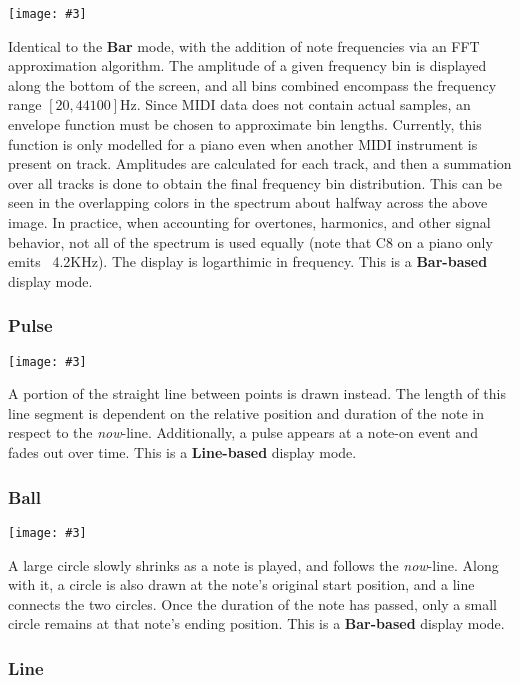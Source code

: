 \documentclass[english]{article}
\makeatletter
\newenvironment{restoretext}%
    {\@parboxrestore%
     \begin{adjustwidth}{}{\leftmargin}%
    }{\end{adjustwidth}
     }
\def\rcbegin{\begin{restoretext}\centering}
\def\rcend{\end{restoretext}}
\newcommand{\rcgnc}[3][]{
  \rcbegin
    \texttt{[image: \#3]}
  \rcend
  \vspace{1em}
}
\makeatother
\begin{document}
\rcgnc{0.86}{image/fft.png}

Identical to the \textbf{Bar} mode, with the addition of note frequencies via 
an FFT approximation algorithm. The amplitude of a given frequency bin is
displayed along the bottom of the screen, and all bins combined encompass the
frequency range $[20, 44100]$Hz.
Since MIDI data does not contain actual samples, an envelope function
must be chosen to approximate bin lengths. Currently, this function
is only modelled for a piano even when another MIDI instrument is present on track. Amplitudes are calculated
for each track, and then a summation over all tracks is done to obtain the final frequency bin distribution.
This can be seen in the overlapping colors in the spectrum about halfway across the above image. In practice, 
when accounting for overtones, harmonics, and other signal behavior, not all of the spectrum is used equally
(note that C8 on a piano only emits ~4.2KHz). The display is logarthimic in frequency. 
This is a \textbf{Bar-based} display mode.

\newpage
\subsubsection{Pulse}

\rcgnc{0.86}{image/pulse.png}

A portion of the straight line between points is drawn instead. The length of this
line segment is dependent on the relative position and duration of the note in respect to the \textit{now}-line.
Additionally, a pulse appears at a note-on event and fades out over time.
This is a \textbf{Line-based} display mode.


\subsubsection{Ball}

\rcgnc{0.86}{image/ball.png}

A large circle slowly shrinks as a note is played, and follows the \textit{now}-line. Along with it, a 
circle is also drawn at the note's original start position, and a line connects the two circles. Once the duration
of the note has passed, only a small circle remains at that note's ending position.
This is a \textbf{Bar-based} display mode.

\newpage

\subsubsection{Line}
\end{document}
